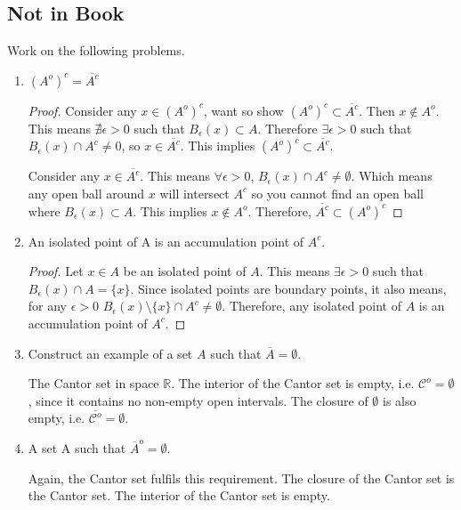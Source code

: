\documentclass{tufte-book}
\theoremstyle{mytheoremstyle}
\theoremstyle{mylemstyle}
\theoremstyle{mydefstyle}
\begin{document}
\subsection{Not in Book}
Work on the following problems.

\begin{enumerate}
\item $(A^o)^c = \overline{A^c}$
\begin{proof}
Consider any $x \in (A^o)^c$, want so show $(A^o)^c \subset \overline{A^c}$.  Then $x \notin A^o$.  This means $\nexists \epsilon > 0$ such that $B_\epsilon(x) \subset A$.  Therefore $\exists\epsilon > 0$ such that $B_\epsilon(x) \cap A^c \neq 0$, so $x \in \overline{A^c}$.  This implies $(A^o)^c \subset \overline{A^c}$.

Consider any $x \in \overline{A^c}$.  This means $\forall\epsilon >0$, $B_\epsilon(x) \cap A^c \neq \emptyset$.  Which means any open ball around $x$ will intersect $A^c$ so you cannot find an open ball where $B_\epsilon(x) \subset A$.  This implies $x \notin A^o$.  Therefore, $\overline{A^c} \subset (A^o)^c$

\end{proof}

\item An isolated point of A is an accumulation point of $A^c$.

\begin{proof}
Let $x \in A$ be an isolated point of $A$.  This means $\exists\epsilon>0$ such that $B_\epsilon (x) \cap A = \{x\}$.  Since isolated points are boundary points,  it also means, for any $\epsilon >0$ $B_\epsilon(x)\setminus \{x\} \cap A^c \neq \emptyset$.  Therefore, any isolated point of $A$ is an accumulation point of $A^c$.

\end{proof}

\item Construct an example of a set $A$ such that $\overline{A} = \emptyset$.

The Cantor set in space $\mathbb{R}$.  The interior of the Cantor set is empty, i.e. $\mathcal{C}^o = \emptyset$, since it contains no non-empty open intervals.  The closure of $\emptyset$ is also empty, i.e. $\overline{\mathcal{C}^o} = \emptyset$.

\item A set A such that $\overline{A}^o = \emptyset$.

Again, the Cantor set fulfils this requirement.  The closure of the Cantor set is the Cantor set.  The interior of the Cantor set is empty.

\end{enumerate}
\end{document}
